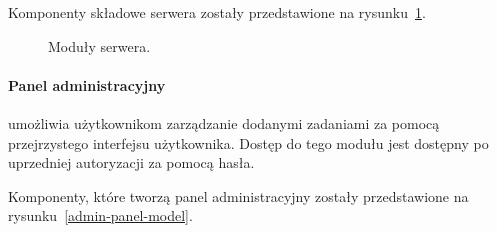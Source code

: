\documentclass[a4paper,11pt,twoside]{report}
\theoremstyle{definition}
\begin{document}
Komponenty składowe serwera zostały przedstawione na rysunku~\ref{server-model}.

\begin{figure} 
    \caption{Moduły serwera.}
    \label{server-model}
\end{figure}

\paragraph{Panel administracyjny}

umożliwia użytkownikom zarządzanie dodanymi zadaniami za pomocą przejrzystego interfejsu użytkownika. Dostęp do tego modułu jest dostępny po uprzedniej autoryzacji za pomocą hasła. 

Komponenty, które tworzą panel administracyjny zostały przedstawione na rysunku~\ref{admin-panel-model}. 
\end{document}
